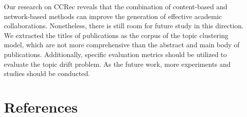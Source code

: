 \documentclass[review]{elsarticle}
\begin{document}
Our research on CCRec reveals that the combination of content-based and network-based methods can improve the generation of effective academic collaborations. Nonetheless, there is still room for future study in this direction. We extracted the titles of publications as the corpus of the topic clustering model, which are not more comprehensive than the abstract and main body of publications. Additionally, specific evaluation metrics should be utilized to evaluate the topic drift problem. As the future work, more experiments and studies should be conducted.

\section*{References}


\end{document}
